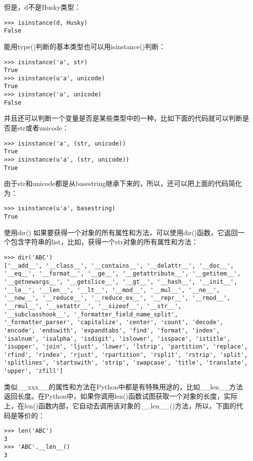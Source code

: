\documentclass[twoside,11pt]{book}
\begin{document}
但是，d不是Husky类型：
\begin{lstlisting}
>>> isinstance(d, Husky)
False
\end{lstlisting}

能用type()判断的基本类型也可以用isinstance()判断：
\begin{lstlisting}
>>> isinstance('a', str)
True
>>> isinstance(u'a', unicode)
True
>>> isinstance('a', unicode)
False
\end{lstlisting}

并且还可以判断一个变量是否是某些类型中的一种，比如下面的代码就可以判断是否是str或者unicode：
\begin{lstlisting}
>>> isinstance('a', (str, unicode))
True
>>> isinstance(u'a', (str, unicode))
True
\end{lstlisting}

由于str和unicode都是从basestring继承下来的，所以，还可以把上面的代码简化为：
\begin{lstlisting}
>>> isinstance(u'a', basestring)
True
\end{lstlisting}

使用dir()
如果要获得一个对象的所有属性和方法，可以使用dir()函数，它返回一个包含字符串的list，比如，获得一个str对象的所有属性和方法：
\begin{lstlisting}
>>> dir('ABC')
['__add__', '__class__', '__contains__', '__delattr__', '__doc__', '__eq__', '__format__', '__ge__', '__getattribute__', '__getitem__', '__getnewargs__', '__getslice__', '__gt__', '__hash__', '__init__', '__le__', '__len__', '__lt__', '__mod__', '__mul__', '__ne__', '__new__', '__reduce__', '__reduce_ex__', '__repr__', '__rmod__', '__rmul__', '__setattr__', '__sizeof__', '__str__', '__subclasshook__', '_formatter_field_name_split', '_formatter_parser', 'capitalize', 'center', 'count', 'decode', 'encode', 'endswith', 'expandtabs', 'find', 'format', 'index', 'isalnum', 'isalpha', 'isdigit', 'islower', 'isspace', 'istitle', 'isupper', 'join', 'ljust', 'lower', 'lstrip', 'partition', 'replace', 'rfind', 'rindex', 'rjust', 'rpartition', 'rsplit', 'rstrip', 'split', 'splitlines', 'startswith', 'strip', 'swapcase', 'title', 'translate', 'upper', 'zfill']
\end{lstlisting}

类似\_\_xxx\_\_的属性和方法在Python中都是有特殊用途的，比如\_\_len\_\_方法返回长度。在Python中，如果你调用len()函数试图获取一个对象的长度，实际上，在len()函数内部，它自动去调用该对象的\_\_len\_\_()方法，所以，下面的代码是等价的：
\begin{lstlisting}
>>> len('ABC')
3
>>> 'ABC'.__len__()
3
\end{lstlisting}
\end{document}
